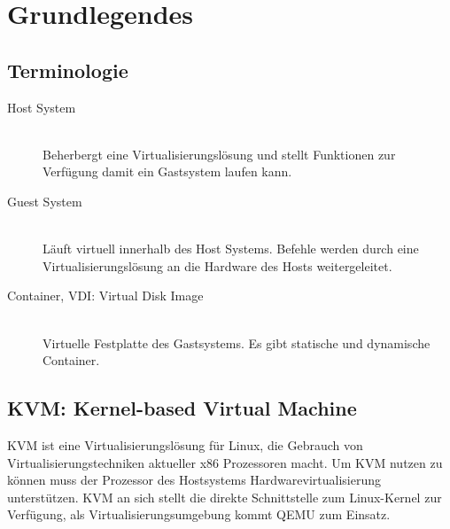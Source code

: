 

\newcommand{\SUBJECT}{Report}
\newcommand{\TITLE}{Cloud Infrastructre Lab 4}











\section{Grundlegendes}
\subsection{Terminologie}
\begin{description}
	\item[Host System] \hfill \\
	Beherbergt eine Virtualisierungslösung und stellt Funktionen zur Verfügung damit ein Gastsystem laufen kann.
	\item[Guest System] \hfill \\
	Läuft virtuell innerhalb des Host Systems. Befehle werden durch eine Virtualisierungslösung an die Hardware des Hosts weitergeleitet. 
	\item[Container, VDI: Virtual Disk Image] \hfill \\
	 Virtuelle Festplatte des Gastsystems. Es gibt statische und dynamische Container.
\end{description}

\subsection{KVM: Kernel-based Virtual Machine}
KVM ist eine Virtualisierungslösung für Linux, die Gebrauch von Virtualisierungstechniken aktueller x86 Prozessoren macht. Um KVM nutzen zu können muss der Prozessor des Hostsystems Hardwarevirtualisierung unterstützen.  KVM an sich stellt die direkte Schnittstelle zum Linux-Kernel zur Verfügung, als Virtualisierungsumgebung kommt QEMU zum Einsatz.

